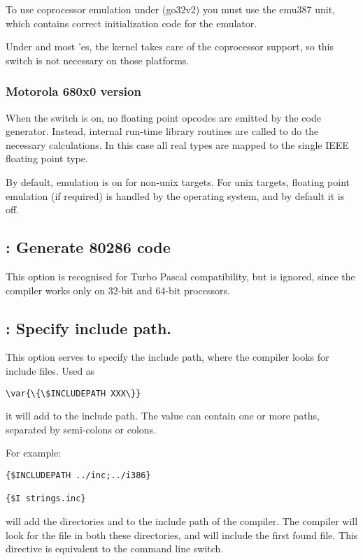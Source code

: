 To use coprocessor emulation under \dos (go32v2) you must use the
emu387 unit, which contains correct initialization code for the
emulator.

Under \linux and most \unix'es, the kernel takes care of the
coprocessor support, so this switch is not necessary on those platforms.

\subsubsection{Motorola 680x0 version}

When the switch is on, no floating point opcodes are emitted
by the code generator. Instead, internal run-time library routines
are called to do the necessary calculations. In this case all
real types are mapped to the single IEEE floating point type.

\begin{remark}By default, emulation is on for non-unix targets. 
For unix targets, floating point emulation (if required) is handled
by the operating system, and by default it is off.
\end{remark}

\subsection{ : Generate 80286 code}

This option is recognised for Turbo Pascal compatibility, but is ignored,
since the compiler works only on 32-bit and 64-bit processors.

\subsection{ : Specify include path.}

This option serves to specify the include path, where the compiler looks for
include files. Used as
\begin{verbatim}
\var{\{\$INCLUDEPATH XXX\}}
\end{verbatim}
it will add  to the include path. The value  can contain one or more paths, 
separated by semi-colons or colons.

For example:
\begin{verbatim}
{$INCLUDEPATH ../inc;../i386}

{$I strings.inc}
\end{verbatim}

will add the directories  and  to the include
path of the compiler. The compiler will look for the file 
in both these directories, and will include the first found file. This directive is
equivalent to the  command line switch.

